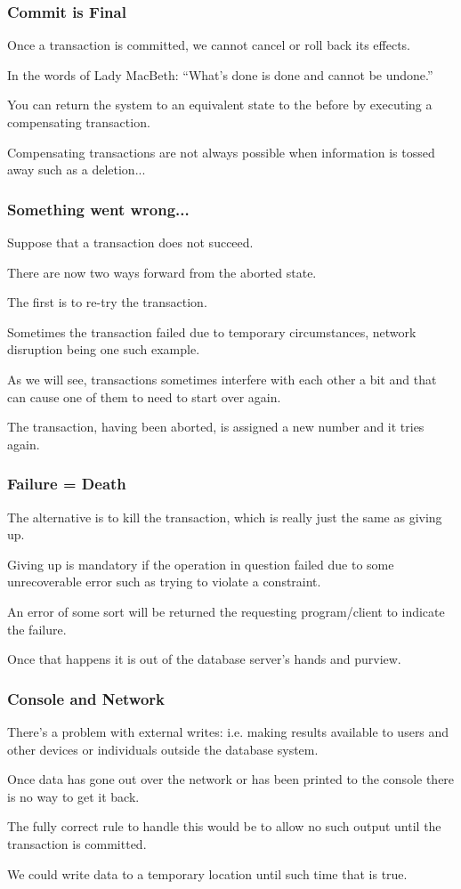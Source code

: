 \begin{frame}
\frametitle{Commit is Final}

Once a transaction is committed, we cannot cancel or roll back its effects. 

In the words of Lady MacBeth: ``What's done is done and cannot be undone.'' 

You can return the system to an equivalent state to the before by executing a \alert{compensating transaction}.

 Compensating transactions are not always possible when information is tossed away such as a deletion...

\end{frame}

\begin{frame}
\frametitle{Something went wrong...}

Suppose that a transaction does not succeed. 

There are now two ways forward from the aborted state. 

The first is to re-try the transaction. 

Sometimes the transaction failed due to temporary circumstances, network disruption being one such example. 

As we will see, transactions sometimes interfere with each other a bit and that can cause one of them to need to start over again. 

The transaction, having been aborted, is assigned a new number and it tries again.


\end{frame}

\begin{frame}
\frametitle{Failure = Death}

The alternative is to kill the transaction, which is really just the same as giving up. 

Giving up is mandatory if the operation in question failed due to some unrecoverable error such as trying to violate a constraint.

 An error of some sort will be returned the requesting program/client to indicate the failure. 
 
 Once that happens it is out of the database server's hands and purview.
\end{frame}



\begin{frame}
\frametitle{Console and Network}

There's a problem with external writes: i.e. making results available to users and other devices or individuals outside the database system. 

Once data has gone out over the network or has been printed to the console there is no way to get it back. 

The fully correct rule to handle this would be to allow no such output until the transaction is committed. 

We could write data to a temporary location until such time that is true. 


\end{frame}

